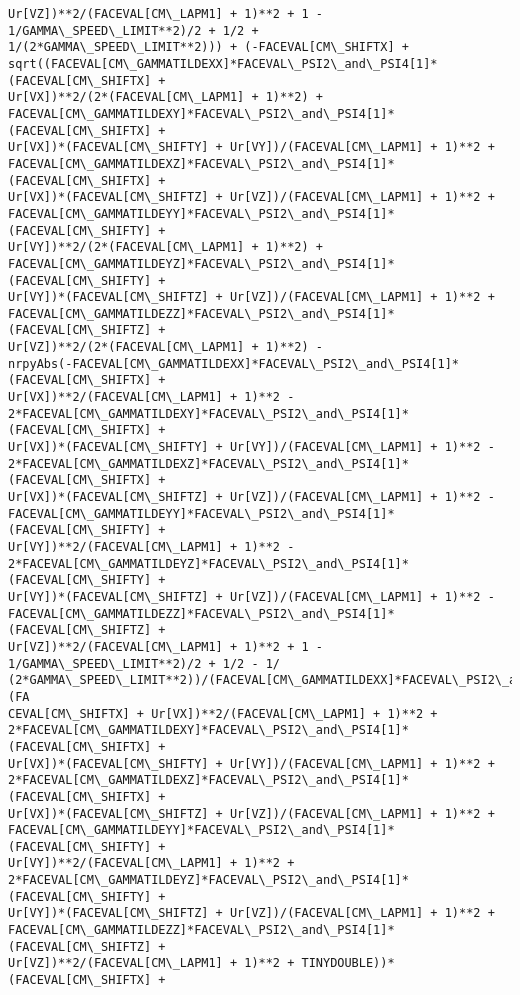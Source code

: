 \documentclass[landscape,letterpaper,10pt,english]{article}
\begin{document}
\begin{Verbatim}[commandchars=\\\{\}]
Ur[VZ])**2/(FACEVAL[CM\_LAPM1] + 1)**2 + 1 - 1/GAMMA\_SPEED\_LIMIT**2)/2 + 1/2 +
1/(2*GAMMA\_SPEED\_LIMIT**2))) + (-FACEVAL[CM\_SHIFTX] +
sqrt((FACEVAL[CM\_GAMMATILDEXX]*FACEVAL\_PSI2\_and\_PSI4[1]*(FACEVAL[CM\_SHIFTX] +
Ur[VX])**2/(2*(FACEVAL[CM\_LAPM1] + 1)**2) +
FACEVAL[CM\_GAMMATILDEXY]*FACEVAL\_PSI2\_and\_PSI4[1]*(FACEVAL[CM\_SHIFTX] +
Ur[VX])*(FACEVAL[CM\_SHIFTY] + Ur[VY])/(FACEVAL[CM\_LAPM1] + 1)**2 +
FACEVAL[CM\_GAMMATILDEXZ]*FACEVAL\_PSI2\_and\_PSI4[1]*(FACEVAL[CM\_SHIFTX] +
Ur[VX])*(FACEVAL[CM\_SHIFTZ] + Ur[VZ])/(FACEVAL[CM\_LAPM1] + 1)**2 +
FACEVAL[CM\_GAMMATILDEYY]*FACEVAL\_PSI2\_and\_PSI4[1]*(FACEVAL[CM\_SHIFTY] +
Ur[VY])**2/(2*(FACEVAL[CM\_LAPM1] + 1)**2) +
FACEVAL[CM\_GAMMATILDEYZ]*FACEVAL\_PSI2\_and\_PSI4[1]*(FACEVAL[CM\_SHIFTY] +
Ur[VY])*(FACEVAL[CM\_SHIFTZ] + Ur[VZ])/(FACEVAL[CM\_LAPM1] + 1)**2 +
FACEVAL[CM\_GAMMATILDEZZ]*FACEVAL\_PSI2\_and\_PSI4[1]*(FACEVAL[CM\_SHIFTZ] +
Ur[VZ])**2/(2*(FACEVAL[CM\_LAPM1] + 1)**2) -
nrpyAbs(-FACEVAL[CM\_GAMMATILDEXX]*FACEVAL\_PSI2\_and\_PSI4[1]*(FACEVAL[CM\_SHIFTX] +
Ur[VX])**2/(FACEVAL[CM\_LAPM1] + 1)**2 -
2*FACEVAL[CM\_GAMMATILDEXY]*FACEVAL\_PSI2\_and\_PSI4[1]*(FACEVAL[CM\_SHIFTX] +
Ur[VX])*(FACEVAL[CM\_SHIFTY] + Ur[VY])/(FACEVAL[CM\_LAPM1] + 1)**2 -
2*FACEVAL[CM\_GAMMATILDEXZ]*FACEVAL\_PSI2\_and\_PSI4[1]*(FACEVAL[CM\_SHIFTX] +
Ur[VX])*(FACEVAL[CM\_SHIFTZ] + Ur[VZ])/(FACEVAL[CM\_LAPM1] + 1)**2 -
FACEVAL[CM\_GAMMATILDEYY]*FACEVAL\_PSI2\_and\_PSI4[1]*(FACEVAL[CM\_SHIFTY] +
Ur[VY])**2/(FACEVAL[CM\_LAPM1] + 1)**2 -
2*FACEVAL[CM\_GAMMATILDEYZ]*FACEVAL\_PSI2\_and\_PSI4[1]*(FACEVAL[CM\_SHIFTY] +
Ur[VY])*(FACEVAL[CM\_SHIFTZ] + Ur[VZ])/(FACEVAL[CM\_LAPM1] + 1)**2 -
FACEVAL[CM\_GAMMATILDEZZ]*FACEVAL\_PSI2\_and\_PSI4[1]*(FACEVAL[CM\_SHIFTZ] +
Ur[VZ])**2/(FACEVAL[CM\_LAPM1] + 1)**2 + 1 - 1/GAMMA\_SPEED\_LIMIT**2)/2 + 1/2 - 1/
(2*GAMMA\_SPEED\_LIMIT**2))/(FACEVAL[CM\_GAMMATILDEXX]*FACEVAL\_PSI2\_and\_PSI4[1]*(FA
CEVAL[CM\_SHIFTX] + Ur[VX])**2/(FACEVAL[CM\_LAPM1] + 1)**2 +
2*FACEVAL[CM\_GAMMATILDEXY]*FACEVAL\_PSI2\_and\_PSI4[1]*(FACEVAL[CM\_SHIFTX] +
Ur[VX])*(FACEVAL[CM\_SHIFTY] + Ur[VY])/(FACEVAL[CM\_LAPM1] + 1)**2 +
2*FACEVAL[CM\_GAMMATILDEXZ]*FACEVAL\_PSI2\_and\_PSI4[1]*(FACEVAL[CM\_SHIFTX] +
Ur[VX])*(FACEVAL[CM\_SHIFTZ] + Ur[VZ])/(FACEVAL[CM\_LAPM1] + 1)**2 +
FACEVAL[CM\_GAMMATILDEYY]*FACEVAL\_PSI2\_and\_PSI4[1]*(FACEVAL[CM\_SHIFTY] +
Ur[VY])**2/(FACEVAL[CM\_LAPM1] + 1)**2 +
2*FACEVAL[CM\_GAMMATILDEYZ]*FACEVAL\_PSI2\_and\_PSI4[1]*(FACEVAL[CM\_SHIFTY] +
Ur[VY])*(FACEVAL[CM\_SHIFTZ] + Ur[VZ])/(FACEVAL[CM\_LAPM1] + 1)**2 +
FACEVAL[CM\_GAMMATILDEZZ]*FACEVAL\_PSI2\_and\_PSI4[1]*(FACEVAL[CM\_SHIFTZ] +
Ur[VZ])**2/(FACEVAL[CM\_LAPM1] + 1)**2 + TINYDOUBLE))*(FACEVAL[CM\_SHIFTX] +

\end{Verbatim}
\end{document}
